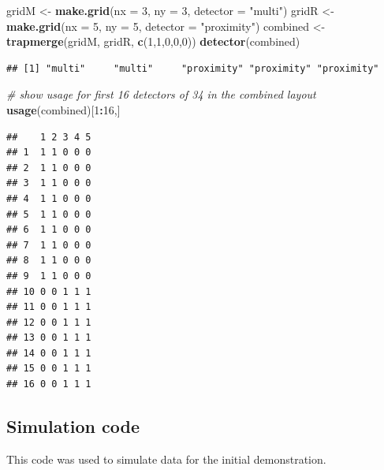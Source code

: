 \documentclass[
]{book}
\newenvironment{Shaded}{\begin{snugshade}}{\end{snugshade}}
\newcommand{\AttributeTok}[1]{\textcolor[rgb]{0.13,0.29,0.53}{#1}}
\newcommand{\CommentTok}[1]{\textcolor[rgb]{0.56,0.35,0.01}{\textit{#1}}}
\newcommand{\DecValTok}[1]{\textcolor[rgb]{0.00,0.00,0.81}{#1}}
\newcommand{\FunctionTok}[1]{\textcolor[rgb]{0.13,0.29,0.53}{\textbf{#1}}}
\newcommand{\NormalTok}[1]{#1}
\newcommand{\OtherTok}[1]{\textcolor[rgb]{0.56,0.35,0.01}{#1}}
\newcommand{\SpecialCharTok}[1]{\textcolor[rgb]{0.81,0.36,0.00}{\textbf{#1}}}
\newcommand{\StringTok}[1]{\textcolor[rgb]{0.31,0.60,0.02}{#1}}
\begin{document}
\begin{Shaded}
\begin{Highlighting}[]
\NormalTok{gridM }\OtherTok{\textless{}{-}} \FunctionTok{make.grid}\NormalTok{(}\AttributeTok{nx =} \DecValTok{3}\NormalTok{, }\AttributeTok{ny =} \DecValTok{3}\NormalTok{, }\AttributeTok{detector =} \StringTok{"multi"}\NormalTok{)}
\NormalTok{gridR }\OtherTok{\textless{}{-}} \FunctionTok{make.grid}\NormalTok{(}\AttributeTok{nx =} \DecValTok{5}\NormalTok{, }\AttributeTok{ny =} \DecValTok{5}\NormalTok{, }\AttributeTok{detector =} \StringTok{"proximity"}\NormalTok{)}
\NormalTok{combined }\OtherTok{\textless{}{-}} \FunctionTok{trapmerge}\NormalTok{(gridM, gridR, }\FunctionTok{c}\NormalTok{(}\DecValTok{1}\NormalTok{,}\DecValTok{1}\NormalTok{,}\DecValTok{0}\NormalTok{,}\DecValTok{0}\NormalTok{,}\DecValTok{0}\NormalTok{))}
\FunctionTok{detector}\NormalTok{(combined)}
\end{Highlighting}
\end{Shaded}

\begin{verbatim}
## [1] "multi"     "multi"     "proximity" "proximity" "proximity"
\end{verbatim}

\begin{Shaded}
\begin{Highlighting}[]
\CommentTok{\# show usage for first 16 detectors of 34 in the combined layout}
\FunctionTok{usage}\NormalTok{(combined)[}\DecValTok{1}\SpecialCharTok{:}\DecValTok{16}\NormalTok{,]}
\end{Highlighting}
\end{Shaded}

\begin{verbatim}
##    1 2 3 4 5
## 1  1 1 0 0 0
## 2  1 1 0 0 0
## 3  1 1 0 0 0
## 4  1 1 0 0 0
## 5  1 1 0 0 0
## 6  1 1 0 0 0
## 7  1 1 0 0 0
## 8  1 1 0 0 0
## 9  1 1 0 0 0
## 10 0 0 1 1 1
## 11 0 0 1 1 1
## 12 0 0 1 1 1
## 13 0 0 1 1 1
## 14 0 0 1 1 1
## 15 0 0 1 1 1
## 16 0 0 1 1 1
\end{verbatim}

\subsection{Simulation code}\label{appendix5}

This code was used to simulate data for the initial demonstration.
\end{document}
